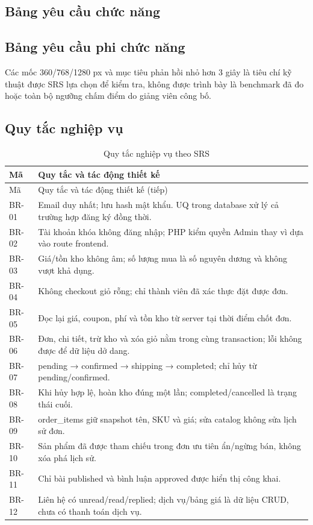 \subsection{Bảng yêu cầu chức năng}


\subsection{Bảng yêu cầu phi chức năng}
Các mốc 360/768/1280 px và mục tiêu phản hồi nhỏ hơn 3 giây là tiêu chí kỹ thuật được SRS lựa chọn để kiểm tra, không được trình bày là benchmark đã đo hoặc toàn bộ ngưỡng chấm điểm do giảng viên công bố.


\subsection{Quy tắc nghiệp vụ}
\begin{longtable}{@{}P{1.5cm}P{13.6cm}@{}}
\caption{Quy tắc nghiệp vụ theo SRS}\label{tab:business-rules}\\
\toprule Mã & Quy tắc và tác động thiết kế\\\midrule\endfirsthead
\toprule Mã & Quy tắc và tác động thiết kế (tiếp)\\\midrule\endhead
BR-01 & Email duy nhất; lưu hash mật khẩu. UQ trong database xử lý cả trường hợp đăng ký đồng thời.\\
BR-02 & Tài khoản khóa không đăng nhập; PHP kiểm quyền Admin thay vì dựa vào route frontend.\\
BR-03 & Giá/tồn kho không âm; số lượng mua là số nguyên dương và không vượt khả dụng.\\
BR-04 & Không checkout giỏ rỗng; chỉ thành viên đã xác thực đặt được đơn.\\
BR-05 & Đọc lại giá, coupon, phí và tồn kho từ server tại thời điểm chốt đơn.\\
BR-06 & Đơn, chi tiết, trừ kho và xóa giỏ nằm trong cùng transaction; lỗi không được để dữ liệu dở dang.\\
BR-07 & pending → confirmed → shipping → completed; chỉ hủy từ pending/confirmed.\\
BR-08 & Khi hủy hợp lệ, hoàn kho đúng một lần; completed/cancelled là trạng thái cuối.\\
BR-09 & order\_items giữ snapshot tên, SKU và giá; sửa catalog không sửa lịch sử đơn.\\
BR-10 & Sản phẩm đã được tham chiếu trong đơn ưu tiên ẩn/ngừng bán, không xóa phá lịch sử.\\
BR-11 & Chỉ bài published và bình luận approved được hiển thị công khai.\\
BR-12 & Liên hệ có unread/read/replied; dịch vụ/bảng giá là dữ liệu CRUD, chưa có thanh toán dịch vụ.\\
\bottomrule\end{longtable}

